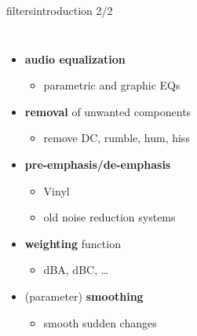 	\begin{frame}{filters}{introduction 2/2}
        \vspace{-5mm}
        \begin{columns}
                \begin{itemize}
                    \item   \textbf{audio equalization}
                        \begin{itemize}
                            \item   parametric and graphic EQs
                        \end{itemize}
                    \smallskip
                    \item<2->   \textbf{removal} of unwanted components
                        \begin{itemize}
                            \item   remove DC, rumble, hum, hiss
                        \end{itemize}
                    \smallskip
                    \item<3->   \textbf{pre-emphasis/de-emphasis}
                        \begin{itemize}
                            \item   Vinyl
                            \item   old  noise reduction systems
                        \end{itemize}
                    \smallskip
                    \item<4->   \textbf{weighting} function
                        \begin{itemize}
                            \item   dBA, dBC, \ldots
                        \end{itemize}
                    \smallskip
                    \item<5->   (parameter) \textbf{smoothing}
                        \begin{itemize}
                            \item   smooth sudden changes
                        \end{itemize}
                \end{itemize}
                \vspace{70mm}
\end{columns}
\end{frame}
